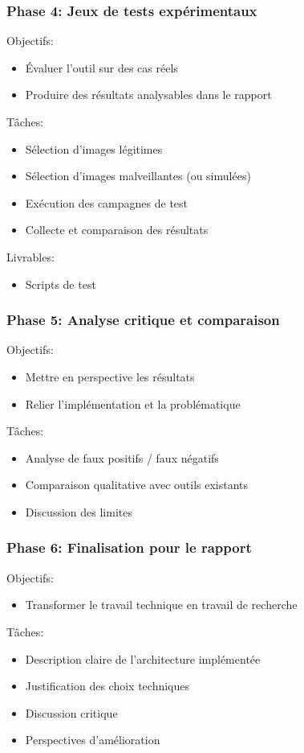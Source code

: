 \subsubsection{Phase 4: Jeux de tests expérimentaux}
Objectifs:
\begin{itemize}
    \item Évaluer l'outil sur des cas réels
    \item Produire des résultats analysables dans le rapport
\end{itemize}
Tâches:
\begin{itemize}
    \item Sélection d'images légitimes
    \item Sélection d'images malveillantes (ou simulées)
    \item Exécution des campagnes de test
    \item Collecte et comparaison des résultats
\end{itemize}
Livrables:
\begin{itemize}
    \item Scripts de test
\end{itemize}

\subsubsection{Phase 5: Analyse critique et comparaison}
Objectifs:
\begin{itemize}
    \item Mettre en perspective les résultats
    \item Relier l'implémentation et la problématique
\end{itemize}
Tâches:
\begin{itemize}
    \item Analyse de faux positifs / faux négatifs
    \item Comparaison qualitative avec outils existants
    \item Discussion des limites
\end{itemize}
\subsubsection{Phase 6: Finalisation pour le rapport}
Objectifs:
\begin{itemize}
    \item Transformer le travail technique en travail de recherche
\end{itemize}
Tâches:
\begin{itemize}
    \item Description claire de l'architecture implémentée
    \item Justification des choix techniques
    \item Discussion critique
    \item Perspectives d'amélioration
\end{itemize}

